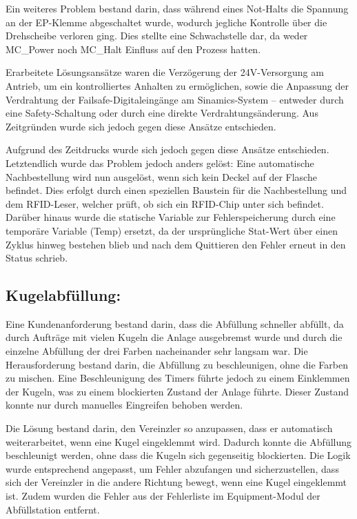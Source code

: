 Ein weiteres Problem bestand darin, dass während eines Not-Halts die Spannung an der EP-Klemme abgeschaltet wurde, wodurch jegliche Kontrolle über die Drehscheibe verloren ging. Dies stellte eine Schwachstelle dar, da weder MC\_Power noch MC\_Halt Einfluss auf den Prozess hatten.

Erarbeitete Lösungsansätze waren die Verzögerung der 24V-Versorgung am Antrieb, um ein kontrolliertes Anhalten zu ermöglichen, sowie die Anpassung der Verdrahtung der Failsafe-Digitaleingänge am Sinamics-System – entweder durch eine Safety-Schaltung oder durch eine direkte Verdrahtungsänderung. Aus Zeitgründen wurde sich jedoch gegen diese Ansätze entschieden.

Aufgrund des Zeitdrucks wurde sich jedoch gegen diese Ansätze entschieden. Letztendlich wurde das Problem jedoch anders gelöst: Eine automatische Nachbestellung wird nun ausgelöst, wenn sich kein Deckel auf der Flasche befindet. Dies erfolgt durch einen speziellen Baustein für die Nachbestellung und dem RFID-Leser, welcher prüft, ob sich ein RFID-Chip unter sich befindet. Darüber hinaus wurde die statische Variable zur Fehlerspeicherung durch eine temporäre Variable (Temp) ersetzt, da der ursprüngliche Stat-Wert über einen Zyklus hinweg bestehen blieb und nach dem Quittieren den Fehler erneut in den Status schrieb.
\subsection{Kugelabfüllung:} 
Eine Kundenanforderung bestand darin, dass die Abfüllung schneller abfüllt, da durch Aufträge mit vielen Kugeln die Anlage ausgebremst wurde und durch die einzelne Abfüllung der drei Farben nacheinander sehr langsam war. Die Herausforderung bestand darin, die Abfüllung zu beschleunigen, ohne die Farben zu mischen. Eine Beschleunigung des Timers führte jedoch zu einem Einklemmen der Kugeln, was zu einem blockierten Zustand der Anlage führte. Dieser Zustand konnte nur durch manuelles Eingreifen behoben werden.

Die Lösung bestand darin, den Vereinzler so anzupassen, dass er automatisch weiterarbeitet, wenn eine Kugel eingeklemmt wird. Dadurch konnte die Abfüllung beschleunigt werden, ohne dass die Kugeln sich gegenseitig blockierten. Die Logik wurde entsprechend angepasst, um Fehler abzufangen und sicherzustellen, dass sich der Vereinzler in die andere Richtung bewegt, wenn eine Kugel eingeklemmt ist. Zudem wurden die Fehler aus der Fehlerliste im Equipment-Modul der Abfüllstation entfernt.
